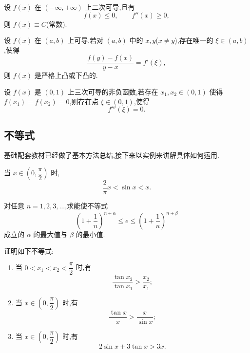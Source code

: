 \documentclass[../数学分析培优讲义.tex]{subfiles}
\begin{document}
\begin{example}
设 $f(x)$ 在 $(-\infty,+\infty)$ 上二次可导,且有
\[
    f(x)\leq0,
    \qquad f''(x)\geq0,
\]
则 $f(x)\equiv C$(常数).
\end{example}
\exampleblank

\begin{example}
设 $f(x)$ 在 $(a,b)$ 上可导,若对 $(a,b)$ 中的 $x,y$($x\neq y$),存在唯一的 $\xi\in(a,b)$,使得
\[
    \dfrac{f(y)-f(x)}{y-x}=f'(\xi),
\]
则 $f(x)$ 是严格上凸或下凸的.
\end{example}
\exampleblank

\begin{example}
设 $f(x)$ 是 $(0,1)$ 上三次可导的非负函数,若存在 $x_1,x_2\in(0,1)$ 使得 $f(x_1)=f(x_2)=0$,则存在点 $\xi\in(0,1)$,使得
\[
    f'''(\xi)=0.
\]
\end{example}
\exampleblank


\newpage

\subsection{不等式}

基础配套教材已经做了基本方法总结,接下来以实例来讲解具体如何运用.


\newpage


\begin{proposition}[\marktwostar]
当 $x\in\left(0,\dfrac{\pi}{2}\right)$ 时,
\[
    \dfrac{2}{\pi}x<\sin x<x.
\]
\end{proposition}

\begin{example}
对任意 $n=1,2,3,\ldots$,求能使不等式
\[
    \left(1+\dfrac{1}{n}\right)^{n+\alpha}
    \leq e
    \leq\left(1+\dfrac{1}{n}\right)^{n+\beta}
\]
成立的 $\alpha$ 的最大值与 $\beta$ 的最小值.
\end{example}
\exampleblank

\begin{example}
证明如下不等式:
\begin{enumerate}[label=(\arabic*)]
    \item 当 $0<x_1<x_2<\dfrac{\pi}{2}$ 时,有
    \[
        \dfrac{\tan x_2}{\tan x_1}>\dfrac{x_2}{x_1};
    \]
    \item 当 $x\in\left(0,\dfrac{\pi}{2}\right)$ 时,有
    \[
        \dfrac{\tan x}{x}>\dfrac{x}{\sin x};
    \]
    \item 当 $x\in\left(0,\dfrac{\pi}{2}\right)$ 时,有
    \[
        2\sin x+3\tan x>3x.
    \]
\end{enumerate}
\end{example}
\exampleblank
\end{document}
